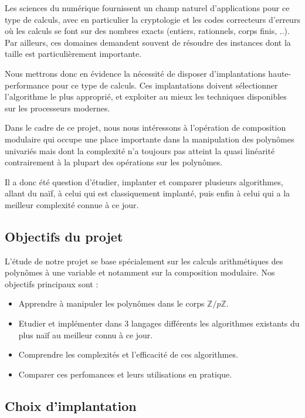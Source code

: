 \documentclass[a4paper]{article}
\begin{document}
Les sciences du numérique fournissent un champ naturel d’applications pour ce type de calculs,
avec en particulier la cryptologie et les codes correcteurs d’erreurs où les calculs se font sur des
nombres exacts (entiers, rationnels, corps finis, ..). Par ailleurs, ces domaines demandent souvent
de résoudre des instances dont la taille est particulièrement importante.

Nous mettrons donc en évidence la nécessité de disposer d’implantations haute-performance pour ce type de calculs. Ces implantations doivent
sélectionner l’algorithme le plus approprié, et exploiter au mieux les techniques disponibles sur
les processeurs modernes. 

Dans le cadre de ce projet, nous nous intéressons à l’opération de composition modulaire 
qui occupe une place importante dans la manipulation des polynômes univariés mais dont la complexité n'a toujours pas atteint la quasi linéarité contrairement à la plupart des opérations sur les polynômes.

Il a donc été question d'étudier, implanter et comparer plusieurs algorithmes, allant du naïf, à celui qui est classiquement
implanté, puis enfin à celui qui a la meilleur complexité connue à ce jour. 


\subsection{Objectifs du projet}

L'étude de notre projet se base spécialement sur les calculs arithmétiques des polynômes à une variable et notamment sur la composition modulaire. Nos objectifs principaux sont :
\begin{itemize}
	\item Apprendre à manipuler les polynômes dans le corps ${\mathbb{Z}/p \mathbb{Z}}$.
	\item Etudier et implémenter dans 3 langages différents les algorithmes existants du plus naïf au meilleur connu à ce jour.
	\item Comprendre les complexités et l'efficacité de ces algorithmes. 
	\item Comparer ces perfomances et leurs utilisations en pratique.
\end{itemize}

\subsection{Choix d'implantation}
\end{document}
